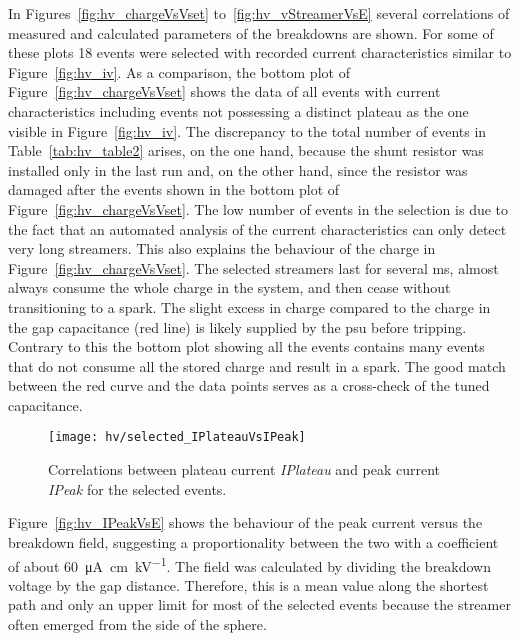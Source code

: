 In Figures~\ref{fig:hv_chargeVsVset} to~\ref{fig:hv_vStreamerVsE} several correlations of measured and calculated parameters of the breakdowns are shown.
For some of these plots \num{18} events were selected with recorded current characteristics similar to Figure~\ref{fig:hv_iv}.
As a comparison, the bottom plot of Figure~\ref{fig:hv_chargeVsVset} shows the data of all events with current characteristics including events not possessing a distinct plateau as the one visible in Figure~\ref{fig:hv_iv}.
The discrepancy to the total number of events in Table~\ref{tab:hv_table2} arises, on the one hand, because the shunt resistor was installed only in the last run and, on the other hand, since the resistor was damaged after the events shown in the bottom plot of Figure~\ref{fig:hv_chargeVsVset}.
The low number of events in the selection is due to the fact that an automated analysis of the current characteristics can only detect very long streamers.
This also explains the behaviour of the charge in Figure~\ref{fig:hv_chargeVsVset}.
The selected streamers last for several \si{\milli\second}, almost always consume the whole charge in the system, and then cease without transitioning to a spark.
The slight excess in charge compared to the charge in the gap capacitance (red line) is likely supplied by the \gls{psu} before tripping.
Contrary to this the bottom plot showing all the events contains many events that do not consume all the stored charge and result in a spark.
The good match between the red curve and the data points serves as a cross-check of the tuned capacitance.

\begin{figure}[tbp]
	\centering
	\texttt{[image: hv/selected\_IPlateauVsIPeak]}
	\caption[ study plateau current versus peak current]{%
		Correlations between plateau current \emph{IPlateau} and peak current \emph{IPeak} for the selected events.
	}
	\label{fig:hv_IPlateauVsIPeak}
\end{figure}

Figure~\ref{fig:hv_IPeakVsE} shows the behaviour of the peak current versus the breakdown field, suggesting a proportionality between the two with a coefficient of about \SI{60}{\micro\ampere\centi\metre\per\kilo\volt}.
The field was calculated by dividing the breakdown voltage by the gap distance.
Therefore, this is a mean value along the shortest path and only an upper limit for most of the selected events because the streamer often emerged from the side of the sphere.

